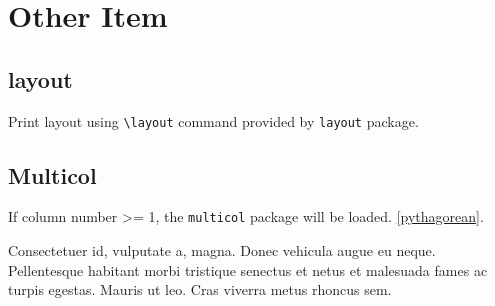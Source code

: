 \documentclass[
  hyper, fancy,
  class=book,
]{zlatex}
\begin{document}
\chapter*{Other Item}
\section{layout}
Print layout using \verb|\layout| command provided by \texttt{layout} package.


\section{Multicol}
If column number >= 1, the \texttt{multicol} package will be loaded. \cref{pythagorean}.

Consectetuer id, vulputate a, magna. Donec vehicula augue eu neque. Pellentesque habitant
morbi tristique senectus et netus et malesuada fames ac turpis egestas. Mauris ut leo. Cras
viverra metus rhoncus sem.
\end{document}

